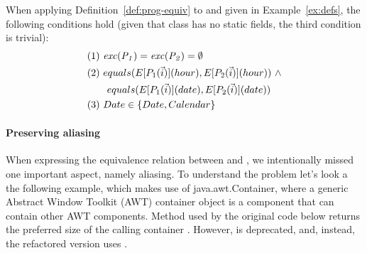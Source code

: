 \documentclass[sigconf,review,anonymous]{acmart}
\begin{document}
\begin{example}\label{ex:equiv}
  When applying Definition~\ref{def:prog-equiv} to  and  given in Example~\ref{ex:defs},
  the following conditions hold (given that class  has no static fields, the third condition is trivial):
\[
\begin{aligned}
      & (1)~ \var{exc(P_1)}=\var{exc(P_2)} =\emptyset\\
      & (2)~ equals(E[P_1(\vec{i})](hour), E[P_2(\vec{i})](hour)) ~ \wedge\\ %
      & \qquad equals(E[P_1(\vec{i})](date), E[P_2(\vec{i})](date))\\
& (3)~  Date \in \{Date, Calendar\}
    \end{aligned}
    \]

 
    
\end{example}


\paragraph{Preserving aliasing}

When expressing the equivalence relation between  and , we intentionally missed one important aspect,
namely aliasing. To understand the problem let's look a the following example, which makes use of java.awt.Container,
where a generic Abstract Window Toolkit (AWT) container object is a component that can contain other AWT components.
Method  used by the original code below returns the preferred size of the calling container .
However,  is deprecated, and, instead, the refactored version uses .
\end{document}
